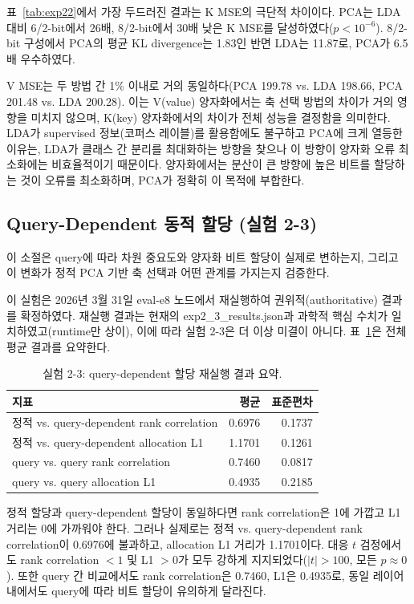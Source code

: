 \documentclass[11pt,a4paper]{article}
\begin{document}
표~\ref{tab:exp22}에서 가장 두드러진 결과는 K MSE의 극단적 차이이다. PCA는 LDA 대비 6/2-bit에서 26배, 8/2-bit에서 30배 낮은 K MSE를 달성하였다($p < 10^{-6}$). 8/2-bit 구성에서 PCA의 평균 KL divergence는 1.83인 반면 LDA는 11.87로, PCA가 6.5배 우수하였다.

V MSE는 두 방법 간 1\% 이내로 거의 동일하다(PCA 199.78 vs. LDA 198.66, PCA 201.48 vs. LDA 200.28). 이는 V(value) 양자화에서는 축 선택 방법의 차이가 거의 영향을 미치지 않으며, K(key) 양자화에서의 차이가 전체 성능을 결정함을 의미한다. LDA가 supervised 정보(코퍼스 레이블)를 활용함에도 불구하고 PCA에 크게 열등한 이유는, LDA가 클래스 간 분리를 최대화하는 방향을 찾으나 이 방향이 양자화 오류 최소화에는 비효율적이기 때문이다. 양자화에서는 분산이 큰 방향에 높은 비트를 할당하는 것이 오류를 최소화하며, PCA가 정확히 이 목적에 부합한다.

\subsection{Query-Dependent 동적 할당 (실험 2-3)}

이 소절은 query에 따라 차원 중요도와 양자화 비트 할당이 실제로 변하는지, 그리고 이 변화가 정적 PCA 기반 축 선택과 어떤 관계를 가지는지 검증한다.

이 실험은 2026년 3월 31일 eval-e8 노드에서 재실행하여 권위적(authoritative) 결과를 확정하였다. 재실행 결과는 현재의 exp2\_3\_results.json과 과학적 핵심 수치가 일치하였고(runtime만 상이), 이에 따라 실험 2-3은 더 이상 미결이 아니다. 표~\ref{tab:exp23}은 전체 평균 결과를 요약한다.

\begin{table}[H]
\centering
\caption{실험 2-3: query-dependent 할당 재실행 결과 요약.}
\label{tab:exp23}
\small
\begin{tabular}{lrr}
\toprule
\textbf{지표} & \textbf{평균} & \textbf{표준편차} \\
\midrule
정적 vs. query-dependent rank correlation & 0.6976 & 0.1737 \\
정적 vs. query-dependent allocation L1 & 1.1701 & 0.1261 \\
query vs. query rank correlation & 0.7460 & 0.0817 \\
query vs. query allocation L1 & 0.4935 & 0.2185 \\
\bottomrule
\end{tabular}
\end{table}

정적 할당과 query-dependent 할당이 동일하다면 rank correlation은 1에 가깝고 L1 거리는 0에 가까워야 한다. 그러나 실제로는 정적 vs. query-dependent rank correlation이 0.6976에 불과하고, allocation L1 거리가 1.1701이다. 대응 $t$ 검정에서도 rank correlation $< 1$ 및 L1 $> 0$가 모두 강하게 지지되었다($|t| > 100$, 모든 $p \approx 0$). 또한 query 간 비교에서도 rank correlation은 0.7460, L1은 0.4935로, 동일 레이어 내에서도 query에 따라 비트 할당이 유의하게 달라진다.
\end{document}
